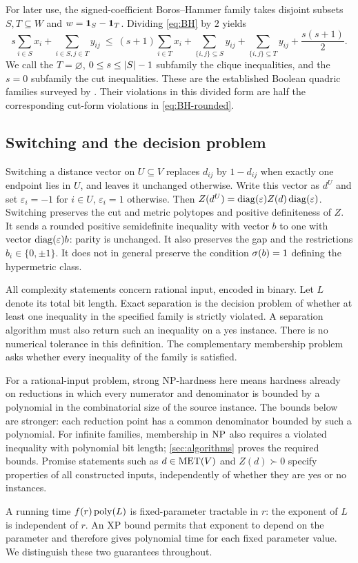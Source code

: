 For later use, the signed-coefficient Boros--Hammer family takes
disjoint subsets $S,T\subseteq W$ and $w=\mathbf 1_S-\mathbf 1_T$.
Dividing \cref{eq:BH} by $2$ yields
\begin{equation}\label{eq:finite-BH}
 s\sum_{i\in S}x_i+\sum_{i\in S,j\in T}y_{ij}
 \ \leq\ (s+1)\sum_{i\in T}x_i
 +\sum_{\{i,j\}\subseteq S}y_{ij}
 +\sum_{\{i,j\}\subseteq T}y_{ij}+\frac{s(s+1)}2.
\end{equation}
We call the $T=\varnothing$, $0\leq s\leq\left\lvert S\right\rvert-1$ subfamily the
clique inequalities, and the $s=0$ subfamily the cut inequalities.
These are the established Boolean quadric families surveyed by
\citet{Letchford2022}.  Their violations in this divided form are half
the corresponding cut-form violations in \cref{eq:BH-rounded}.

\subsection{Switching and the decision problem}

Switching a distance vector on $U\subseteq V$ replaces $d_{ij}$ by
$1-d_{ij}$ when exactly one endpoint lies in $U$, and leaves it
unchanged otherwise.  Write this vector as $d^U$ and set
$\varepsilon_i=-1$ for $i\in U$, $\varepsilon_i=1$ otherwise.
Then $Z(d^U)=\operatorname{diag}(\varepsilon)Z(d)\operatorname{diag}(\varepsilon)$.
Switching preserves the cut and metric polytopes and positive
definiteness of $Z$.  It sends a rounded positive semidefinite
inequality with vector $b$ to one with vector
$\operatorname{diag}(\varepsilon)b$: parity is unchanged.
It also preserves the gap and the restrictions $b_i\in\{0,\pm1\}$.
It does not in general preserve the condition $\sigma(b)=1$ defining
the hypermetric class.

All complexity statements concern rational input, encoded in binary.
Let $L$ denote its total bit length.  Exact separation is the decision
problem of whether at least one inequality in the specified family is
strictly violated.  A separation algorithm must also return such an
inequality on a yes instance.  There is no numerical tolerance in this
definition.  The complementary membership problem asks whether every
inequality of the family is satisfied.

For a rational-input problem, strong NP-hardness here means hardness
already on reductions in which every numerator and denominator is
bounded by a polynomial in the combinatorial size of the source
instance.  The bounds below are stronger: each reduction point has a
common denominator bounded by such a polynomial.  For infinite
families, membership in $\mathrm{NP}$ also requires a violated inequality with
polynomial bit length; \cref{sec:algorithms} proves the required bounds.
Promise statements such as $d\in\operatorname{MET}(V)$ and $Z(d)\succ0$ specify
properties of all constructed inputs, independently of whether they
are yes or no instances.

A running time $f(r)\operatorname{poly}(L)$ is fixed-parameter tractable in $r$:
the exponent of $L$ is independent of $r$.  An XP bound permits that
exponent to depend on the parameter and therefore gives polynomial
time for each fixed parameter value.  We distinguish these two
guarantees throughout.
